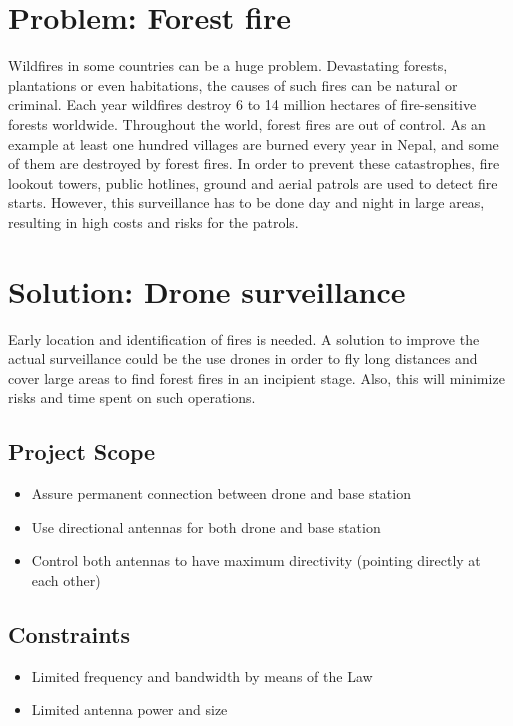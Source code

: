 \section*{Problem: Forest fire}
Wildfires in some countries can be a huge problem. Devastating forests, plantations or even habitations, the causes of such fires can be natural or criminal.
Each year wildfires destroy 6 to 14 million hectares of fire-sensitive forests worldwide. Throughout the world, forest fires are out of control. As an example at least one hundred villages are burned every year in Nepal, and some of them are destroyed by forest fires.
In order to prevent these catastrophes, fire lookout towers, public hotlines, ground and aerial patrols are used to detect fire starts. However, this surveillance has to be done day and night in large areas, resulting in high costs and risks for the patrols.

\section*{Solution: Drone surveillance}
Early location and identification of fires is needed. A solution to improve the actual surveillance could be the use drones in order to fly long distances and cover large areas to find forest fires in an incipient stage. Also, this will minimize risks and time spent on such operations. 

\subsection*{Project Scope}
\begin{itemize}  
        \item Assure permanent connection between drone and base station
        \item Use directional antennas for both drone and base station 
        \item Control both antennas to have maximum directivity (pointing directly at each other)
\end{itemize}

\subsection*{Constraints}
\begin{itemize}  
        \item Limited frequency and bandwidth by means of the Law
        \item Limited antenna power and size
\end{itemize}

